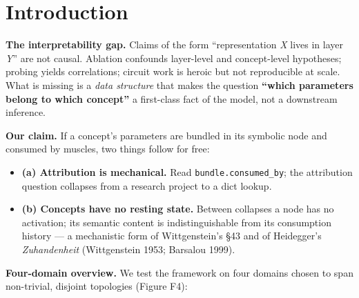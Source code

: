 \section{Introduction}

\textbf{The interpretability gap.} Claims of the form ``representation \emph{X}
lives in layer \emph{Y}'' are not causal. Ablation confounds layer-level and
concept-level hypotheses; probing yields correlations; circuit work is
heroic but not reproducible at scale. What is missing is a \emph{data
structure} that makes the question \textbf{``which parameters belong to which
concept''} a first-class fact of the model, not a downstream inference.

\textbf{Our claim.} If a concept's parameters are bundled in its symbolic
node and consumed by muscles, two things follow for free:

\begin{itemize}
\tightlist
\item
  \textbf{(a) Attribution is mechanical.} Read \texttt{bundle.consumed\_by}; the
  attribution question collapses from a research project to a dict
  lookup.
\item
  \textbf{(b) Concepts have no resting state.} Between collapses a node has
  no activation; its semantic content is indistinguishable from its
  consumption history --- a mechanistic form of Wittgenstein's §43 and of
  Heidegger's \emph{Zuhandenheit} (Wittgenstein 1953; Barsalou 1999).
\end{itemize}

\textbf{Four-domain overview.} We test the framework on four domains
chosen to span non-trivial, disjoint topologies (Figure F4):

